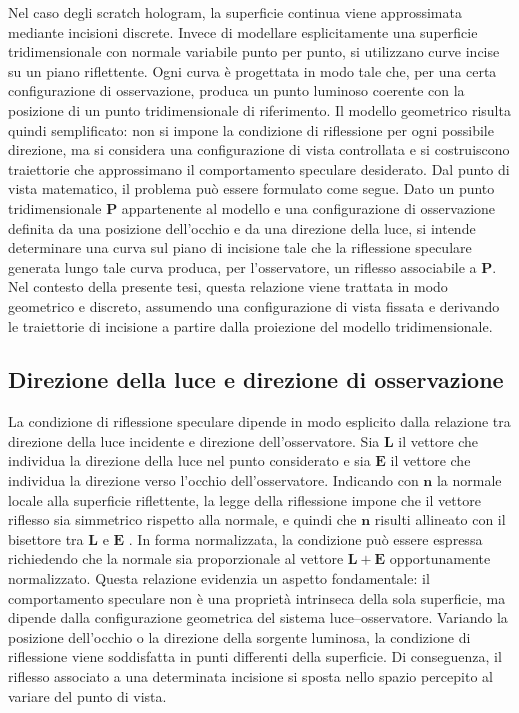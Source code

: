 \documentclass[a4paper,11pt,titlepage,twoside]{book}
\newcommand{\1}{\mathbf{1}}
\numberwithin{equation}{chapter}
\theoremstyle{plain}
\theoremstyle{definition}
\begin{document}
	Nel caso degli scratch hologram, la superficie continua viene approssimata mediante incisioni discrete. Invece di modellare esplicitamente una superficie tridimensionale con normale variabile punto per punto, si utilizzano curve incise su un piano riflettente. Ogni curva è progettata in modo tale che, per una certa configurazione di osservazione, produca un punto luminoso coerente con la posizione di un punto tridimensionale di riferimento. Il modello geometrico risulta quindi semplificato: non si impone la condizione di riflessione per ogni possibile direzione, ma si considera una configurazione di vista controllata e si costruiscono traiettorie che approssimano il comportamento speculare desiderato.
	Dal punto di vista matematico, il problema può essere formulato come segue. Dato un punto tridimensionale $\mathbf{P}$ appartenente al modello e una configurazione di osservazione definita da una posizione dell’occhio e da una direzione della luce, si intende determinare una curva sul piano di incisione tale che la riflessione speculare generata lungo tale curva produca, per l’osservatore, un riflesso associabile a $\mathbf{P}$. Nel contesto della presente tesi, questa relazione viene trattata in modo geometrico e discreto, assumendo una configurazione di vista fissata e derivando le traiettorie di incisione a partire dalla proiezione del modello tridimensionale.
	
	\subsection{Direzione della luce e direzione di osservazione}
	
	La condizione di riflessione speculare dipende in modo esplicito dalla relazione tra direzione della luce incidente e direzione dell’osservatore. Sia $\mathbf{L}$ il vettore che individua la direzione della luce nel punto considerato e sia $\mathbf{E}$ il vettore che individua la direzione verso l’occhio dell’osservatore. Indicando con $\mathbf{n}$ la normale locale alla superficie riflettente, la legge della riflessione impone che il vettore riflesso sia simmetrico rispetto alla normale, e quindi che $\mathbf{n}$ risulti allineato con il bisettore tra $\mathbf{L}$ e $\mathbf{E}$ \cite{Brand2011}. In forma normalizzata, la condizione può essere espressa richiedendo che la normale sia proporzionale al vettore $\mathbf{L} + \mathbf{E}$ opportunamente normalizzato.
	Questa relazione evidenzia un aspetto fondamentale: il comportamento speculare non è una proprietà intrinseca della sola superficie, ma dipende dalla configurazione geometrica del sistema luce–osservatore. Variando la posizione dell’occhio o la direzione della sorgente luminosa, la condizione di riflessione viene soddisfatta in punti differenti della superficie. Di conseguenza, il riflesso associato a una determinata incisione si sposta nello spazio percepito al variare del punto di vista.
	
\end{document}
